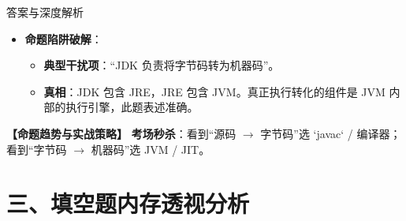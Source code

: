 \documentclass[12pt, a4paper]{ctexart}
\begin{document}
\begin{enumerate}[label=\textbf{\arabic*.}]
\begin{bluebox}{答案与深度解析}
\begin{itemize}[leftmargin=*, nosep]
			      \item \textbf{命题陷阱破解}：
			            \begin{itemize}
				            \item \textbf{典型干扰项}：“JDK 负责将字节码转为机器码”。
				            \item \textbf{真相}：JDK 包含 JRE，JRE 包含 JVM。真正执行转化的组件是 JVM 内部的执行引擎，此题表述准确。
			            \end{itemize}
		      \end{itemize}

		      \textbf{【命题趋势与实战策略】}
		      \textbf{考场秒杀}：看到“源码 $\rightarrow$ 字节码”选 `javac` / 编译器；看到“字节码 $\rightarrow$ 机器码”选 JVM / JIT。
	      \end{bluebox}
\end{enumerate}

\newpage
\section{三、填空题内存透视分析}
\end{document}
